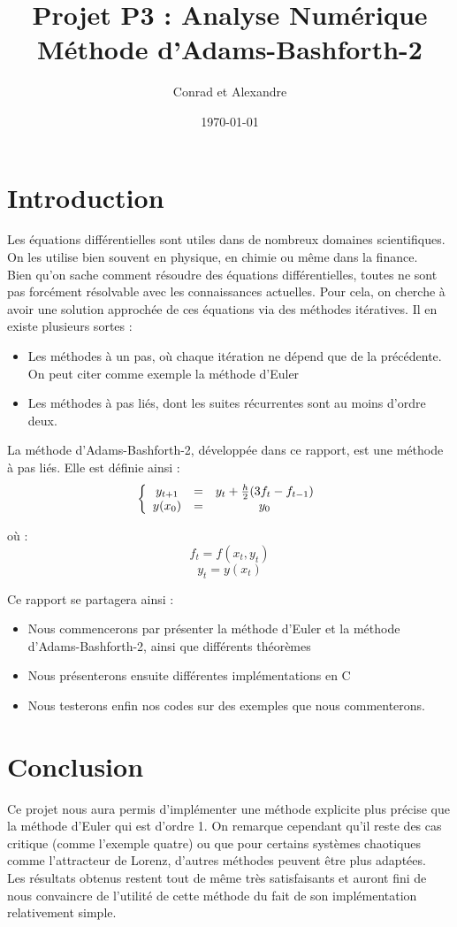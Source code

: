 \documentclass{article}
\author{Conrad \bsc{Hillairet} et Alexandre \bsc{Vieira}}
\title{Projet P3 : Analyse Numérique \\ \Large{Méthode d'Adams-Bashforth-2}}
\date{\today}
\begin{document}
\maketitle

\setcounter{tocdepth}{4}
\tableofcontents
\newpage

\section*{Introduction}
Les équations différentielles sont utiles dans de nombreux domaines scientifiques. On les utilise bien souvent en physique, en chimie ou même dans la finance. \\
Bien qu'on sache comment résoudre des équations différentielles, toutes ne sont pas forcément résolvable avec les connaissances actuelles. Pour cela, on cherche à avoir une solution approchée de ces équations via des méthodes itératives. Il en existe plusieurs sortes :\\
\begin{itemize}
	\item Les méthodes à un pas, où chaque itération ne dépend que de la précédente. On peut citer comme exemple la méthode d'Euler
	\item Les méthodes à pas liés, dont les suites récurrentes sont au moins d'ordre deux.
\end{itemize}

\bigskip
La méthode d'Adams-Bashforth-2, développée dans ce rapport, est une méthode à pas liés. Elle est définie ainsi :
\[
	\left\{
		\begin{array}{c c c}
			y_{t+1}&=&y_t + \frac{h}{2}(3f_t-f_{t-1})\\
			y(x_0)&=&y_0
		\end{array}
	\right.
\]

où :
\[f_t=f(x_t,y_t)\]
\[y_t=y(x_t)\]

Ce rapport se partagera ainsi :
\begin{itemize}
	\item Nous commencerons par présenter la méthode d'Euler et la méthode d'Adams-Bashforth-2, ainsi que différents théorèmes
	\item Nous présenterons ensuite différentes implémentations en C
	\item Nous testerons enfin nos codes sur des exemples que nous commenterons.
\end{itemize}





\newpage
\section*{Conclusion}
Ce projet nous aura permis d'implémenter une méthode explicite plus précise que la méthode d'Euler qui est d'ordre 1. On remarque cependant qu'il reste des cas critique (comme l'exemple quatre) ou que pour certains systèmes chaotiques comme l'attracteur de Lorenz, d'autres méthodes peuvent être plus adaptées.\\
Les résultats obtenus restent tout de même très satisfaisants et auront fini de nous convaincre de l'utilité de cette méthode du fait de son implémentation relativement simple. 

\newpage
\appendix

\end{document}
